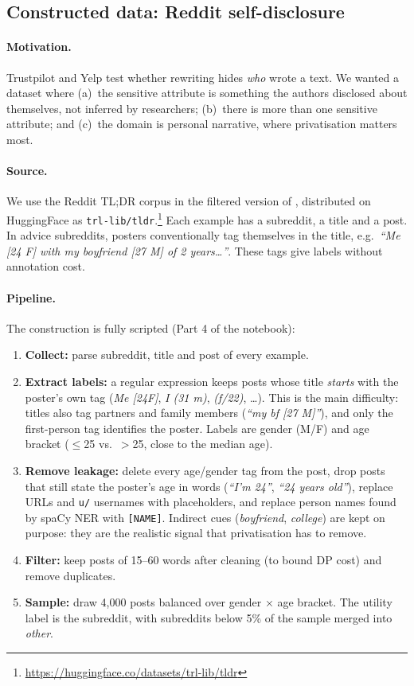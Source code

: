 \documentclass[11pt]{article}
\begin{document}
\subsection{Constructed data: Reddit self-disclosure}
\paragraph{Motivation.} Trustpilot and Yelp test whether rewriting hides \emph{who} wrote a text. We wanted a dataset where (a)~the sensitive attribute is something the authors disclosed about themselves, not inferred by researchers; (b)~there is more than one sensitive attribute; and (c)~the domain is personal narrative, where privatisation matters most.

\paragraph{Source.} We use the Reddit TL;DR corpus \citep{volske-etal-2017-tl} in the filtered version of \citet{stiennon2020learning}, distributed on HuggingFace as \texttt{trl-lib/tldr}.\footnote{\url{https://huggingface.co/datasets/trl-lib/tldr}} Each example has a subreddit, a title and a post. In advice subreddits, posters conventionally tag themselves in the title, e.g.\ \emph{``Me [24 F] with my boyfriend [27 M] of 2 years\ldots''}. These tags give labels without annotation cost.

\paragraph{Pipeline.} The construction is fully scripted (Part 4 of the notebook):
\begin{enumerate}
\setlength\itemsep{0pt}
\item \textbf{Collect:} parse subreddit, title and post of every example.
\item \textbf{Extract labels:} a regular expression keeps posts whose title \emph{starts} with the poster's own tag (\emph{Me [24F]}, \emph{I (31 m)}, \emph{(f/22)}, \ldots). This is the main difficulty: titles also tag partners and family members (\emph{``my bf [27 M]''}), and only the first-person tag identifies the poster. Labels are gender (M/F) and age bracket ($\le$25 vs.\ $>$25, close to the median age).
\item \textbf{Remove leakage:} delete every age/gender tag from the post, drop posts that still state the poster's age in words (\emph{``I'm 24''}, \emph{``24 years old''}), replace URLs and \texttt{u/} usernames with placeholders, and replace person names found by spaCy NER with \texttt{[NAME]}. Indirect cues (\emph{boyfriend}, \emph{college}) are kept on purpose: they are the realistic signal that privatisation has to remove.
\item \textbf{Filter:} keep posts of 15--60 words after cleaning (to bound DP cost) and remove duplicates.
\item \textbf{Sample:} draw 4{,}000 posts balanced over gender $\times$ age bracket. The utility label is the subreddit, with subreddits below 5\% of the sample merged into \emph{other}.
\end{enumerate}
\end{document}
